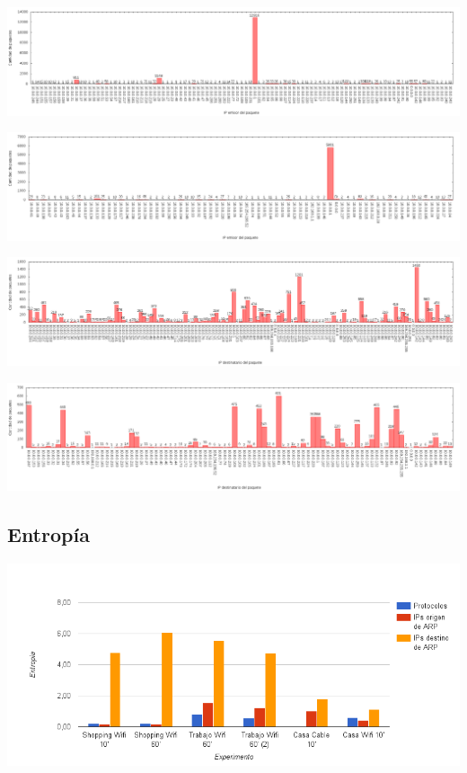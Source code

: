 \begin{center}
\includegraphics[width=16cm]{../mediciones/job1/src.png}
\end{center}

\begin{center}
\includegraphics[width=16cm]{../mediciones/job2/src.png}
\end{center}

\begin{center}
\includegraphics[width=16cm]{../mediciones/job1/dst.png}
\end{center}

\begin{center}
\includegraphics[width=16cm]{../mediciones/job2/dst.png}
\end{center}

\subsection{Entropía}

\begin{center}
\includegraphics[width=14cm]{../mediciones/entropias.png}
\end{center}
